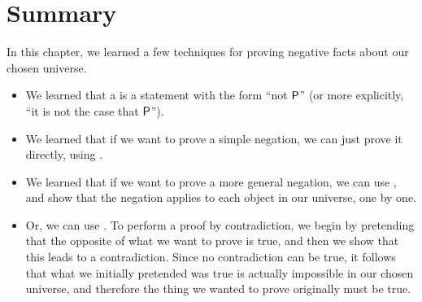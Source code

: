 \documentclass[../../../main.tex]{subfiles}
\begin{document}
\section{Summary}

In this chapter, we learned a few techniques for proving negative facts about our chosen universe.

\begin{itemize}
  
  \item We learned that a  is a statement with the form ``not $\P/$'' (or more explicitly, ``it is not the case that $\P/$'').
  
  \item We learned that if we want to prove a simple negation, we can just prove it directly, using .
  
  \item We learned that if we want to prove a more general negation, we can use , and show that the negation applies to each object in our universe, one by one.
  
  \item Or, we can use . To perform a proof by contradiction, we begin by pretending that the opposite of what we want to prove is true, and then we show that this leads to a contradiction. Since no contradiction can be true, it follows that what we initially pretended was true is actually impossible in our chosen universe, and therefore the thing we wanted to prove originally must be true.

\end{itemize}
\end{document}
